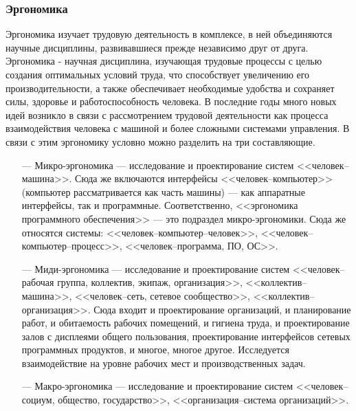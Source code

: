 \subsubsection{Эргономика}
\label{sec:bgd:trud:ergo}
Эргономика изучает трудовую деятельность в комплексе, в ней объединяются научные дисциплины, развивавшиеся прежде независимо друг от друга.
Эргономика - научная дисциплина, изучающая трудовые процессы с целью создания оптимальных условий труда, что способствует увеличению его производительности, а также обеспечивает необходимые удобства и сохраняет силы, здоровье и работоспособность человека. В последние годы много новых идей возникло в связи с рассмотрением трудовой деятельности как процесса взаимодействия человека с машиной и более сложными системами управления. В связи с этим эргономику условно можно разделить на три составляющие.

\begin{itemize}
\item[---] Микро-эргономика --- исследование и проектирование систем <<человек--машина>>. Сюда же включаются интерфейсы <<человек--компьютер>> (компьютер рассматривается как часть машины) --- как аппаратные интерфейсы, так и программные. Соответственно, <<эргономика программного обеспечения>> --- это подраздел микро-эргономики. Сюда же относятся системы: <<человек--компьютер--человек>>, <<человек--компьютер--процесс>>, <<человек--программа, ПО, ОС>>.
\item[---] Миди-эргономика --- исследование и проектирование систем <<человек--рабочая группа, коллектив, экипаж, организация>>, <<коллектив--машина>>, <<человек--сеть, сетевое сообщество>>, <<коллектив--организация>>. Сюда входит и проектирование организаций, и планирование работ, и обитаемость рабочих помещений, и гигиена труда, и проектирование залов с дисплеями общего пользования, проектирование интерфейсов сетевых программных продуктов, и многое, многое другое. Исследуется взаимодействие на уровне рабочих мест и производственных задач.
\item[---] Макро-эргономика --- исследование и проектирование систем <<человек--социум, общество, государство>>, <<организация--система организаций>>.
\end{itemize}

